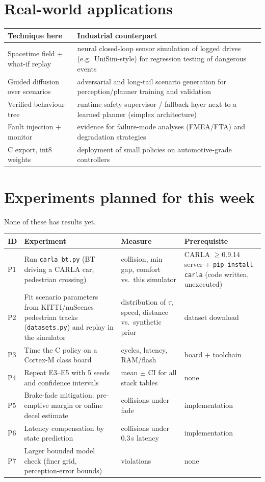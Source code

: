 \section{Real-world applications}
\begin{table}[H]\centering\small
\begin{tabularx}{\linewidth}{lY}\toprule
Technique here & Industrial counterpart\\\midrule
Spacetime field + what-if replay & neural closed-loop sensor simulation of logged drives (e.g.\ UniSim-style) for regression testing of dangerous events\\
Guided diffusion over scenarios & adversarial and long-tail scenario generation for perception/planner training and validation\\
Verified behaviour tree & runtime safety supervisor / fallback layer next to a learned planner (simplex architecture)\\
Fault injection + monitor & evidence for failure-mode analyses (FMEA/FTA) and degradation strategies\\
C export, int8 weights & deployment of small policies on automotive-grade controllers\\\bottomrule
\end{tabularx}
\end{table}

\section{Experiments planned for this week}\label{sec:planned}
None of these has results yet.
\begin{table}[H]\centering\small
\begin{tabularx}{\linewidth}{lYYY}\toprule
ID & Experiment & Measure & Prerequisite\\\midrule
P1 & Run \texttt{carla\_bt.py} (BT driving a CARLA car, pedestrian crossing) & collision, min gap, comfort vs.\ this simulator & CARLA $\ge$0.9.14 server + \texttt{pip install carla} (code written, unexecuted)\\
P2 & Fit scenario parameters from KITTI/nuScenes pedestrian tracks (\texttt{datasets.py}) and replay in the simulator & distribution of $\tau$, speed, distance vs.\ synthetic prior & dataset download\\
P3 & Time the C policy on a Cortex-M class board & cycles, latency, RAM/flash & board + toolchain\\
P4 & Repeat E3--E5 with 5 seeds and confidence intervals & mean $\pm$ CI for all stack tables & none\\
P5 & Brake-fade mitigation: pre-emptive margin or online decel estimate & collisions under fade & implementation\\
P6 & Latency compensation by state prediction & collisions under 0.3\,s latency & implementation\\
P7 & Larger bounded model check (finer grid, perception-error bounds) & violations & none\\\bottomrule
\end{tabularx}
\end{table}

